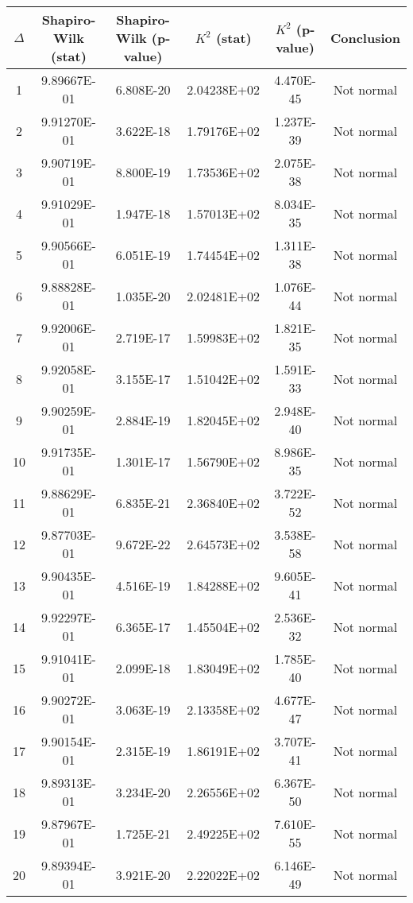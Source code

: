 \begin{table}[h]
	\begin{tabular}{|c|c|c|c|c|c|}
		\hline
		$\Delta$ &  Shapiro-Wilk (stat) & Shapiro-Wilk (p-value) & $K^2$ (stat) & $K^2$ (p-value) & Conclusion\\\hline
		\hline
		1 & 9.89667E-01 & 6.808E-20 & 2.04238E+02 & 4.470E-45 & Not normal\\\hline
		2 & 9.91270E-01 & 3.622E-18 & 1.79176E+02 & 1.237E-39 & Not normal\\\hline
		3 & 9.90719E-01 & 8.800E-19 & 1.73536E+02 & 2.075E-38 & Not normal\\\hline
		4 & 9.91029E-01 & 1.947E-18 & 1.57013E+02 & 8.034E-35 & Not normal\\\hline
		5 & 9.90566E-01 & 6.051E-19 & 1.74454E+02 & 1.311E-38 & Not normal\\\hline
		6 & 9.88828E-01 & 1.035E-20 & 2.02481E+02 & 1.076E-44 & Not normal\\\hline
		7 & 9.92006E-01 & 2.719E-17 & 1.59983E+02 & 1.821E-35 & Not normal\\\hline
		8 & 9.92058E-01 & 3.155E-17 & 1.51042E+02 & 1.591E-33 & Not normal\\\hline
		9 & 9.90259E-01 & 2.884E-19 & 1.82045E+02 & 2.948E-40 & Not normal\\\hline
		10 & 9.91735E-01 & 1.301E-17 & 1.56790E+02 & 8.986E-35 & Not normal\\\hline
		11 & 9.88629E-01 & 6.835E-21 & 2.36840E+02 & 3.722E-52 & Not normal\\\hline
		12 & 9.87703E-01 & 9.672E-22 & 2.64573E+02 & 3.538E-58 & Not normal\\\hline
		13 & 9.90435E-01 & 4.516E-19 & 1.84288E+02 & 9.605E-41 & Not normal\\\hline
		14 & 9.92297E-01 & 6.365E-17 & 1.45504E+02 & 2.536E-32 & Not normal\\\hline
		15 & 9.91041E-01 & 2.099E-18 & 1.83049E+02 & 1.785E-40 & Not normal\\\hline
		16 & 9.90272E-01 & 3.063E-19 & 2.13358E+02 & 4.677E-47 & Not normal\\\hline
		17 & 9.90154E-01 & 2.315E-19 & 1.86191E+02 & 3.707E-41 & Not normal\\\hline
		18 & 9.89313E-01 & 3.234E-20 & 2.26556E+02 & 6.367E-50 & Not normal\\\hline
		19 & 9.87967E-01 & 1.725E-21 & 2.49225E+02 & 7.610E-55 & Not normal\\\hline
		20 & 9.89394E-01 & 3.921E-20 & 2.22022E+02 & 6.146E-49 & Not normal\\\hline

\end{tabular}
\end{table}
